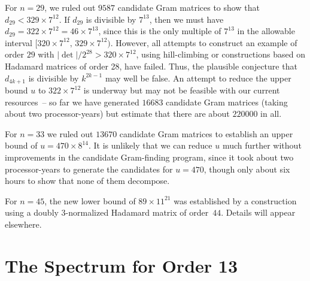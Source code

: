 \documentclass[11pt,a4paper]{article}
\begin{document}
For $n=29$, we ruled out $9587$ candidate Gram matrices to
show that $d_{29} < 329 \times 7^{12}$.
If $d_{29}$ is divisible by $7^{13}$, then we must
have $d_{29} = 322 \times 7^{12} = 46 \times 7^{13}$, 
since this is the only multiple of $7^{13}$ in the allowable interval
$[320\times 7^{12},\, 329 \times 7^{12})$.
However, all attempts to
construct an example of order $29$
with $|\det|/2^{28} > 320\times 7^{12}$, using hill-climbing or constructions
based on Hadamard matrices of order 28, have failed.
Thus, the plausible conjecture that $d_{4k+1}$ is divisible by $k^{2k-1}$
may well be false.
An attempt to reduce the upper bound $u$ to $322 \times 7^{12}$ 
is underway but may
not be feasible with our current resources~-- so far we have
generated $16683$ candidate Gram matrices (taking about two processor-years)
but estimate that there are 
about $220000$ in all. 

For $n=33$ we ruled out 
$13670$ candidate Gram matrices to establish an upper 
bound of $u = 470 \times 8^{14}$. It is unlikely that we can reduce
$u$ much further without improvements in the candidate Gram-finding
program, since it took about two processor-years to generate
the candidates for $u = 470$, though only about six hours to show that
none of them decompose.

For $n=45$, the new lower bound of $89 \times 11^{21}$ was
established by a construction using 
a doubly 3-normalized Hadamard matrix of order~$44$.
Details will appear elsewhere.  %

\section{The Spectrum for Order 13}	\label{sec:spectrum}
\end{document}
